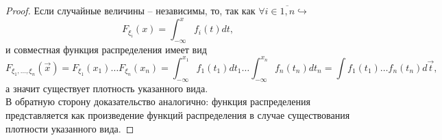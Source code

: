 \begin{proof}
    Если случайные величины -- независимы, то, так как $\forall i \in \overline{1, n} \hookrightarrow$
    \[
        F_{\xi_i}(x) = \int_{-\infty}^x f_i(t)dt,
    \]
    и совместная функция распределения имеет вид
    \[
        F_{\xi_1, \ldots, \xi_n}(\vec{x})  = F_{\xi_1}(x_1)\ldots F_{\xi_n}(x_n) = \int_{-\infty}^{x_1} f_1(t_1)dt_1 \ldots \int_{-\infty}^{x_n}f_n(t_n)dt_n = \int f_1(t_1)\ldots f_n(t_n)d\vec{t},
    \]
    а значит существует плотность указанного вида. \\
    В обратную сторону доказательство аналогично: функция распределения представляется как произведение функций распределения в случае существования плотности указанного вида.
\end{proof}